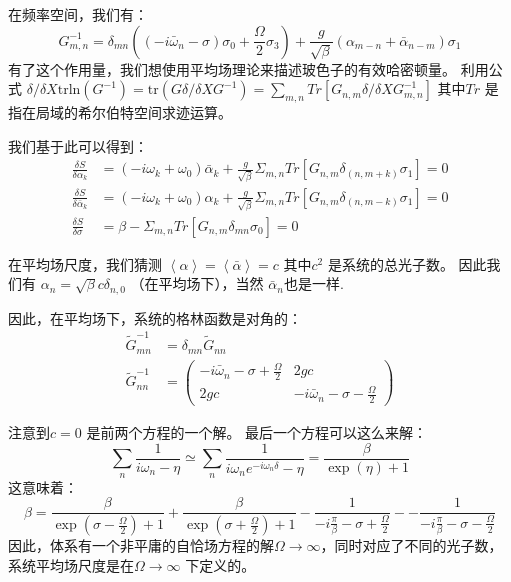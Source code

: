 \documentclass[supercite]{HustGraduPaper}
\begin{document}
在频率空间，我们有：
\begin{equation}
G^{-1}_{m,n} = \delta_{mn} \left( (-i \bar \omega_n-\sigma) \sigma_0 + \frac{\Omega}{2} \sigma_3 \right) + \frac{g}{\sqrt{\beta}} (\alpha_{m-n} + \bar \alpha_{n-m}) \sigma_1
\end{equation}
有了这个作用量，我们想使用平均场理论来描述玻色子的有效哈密顿量。
利用公式 $\delta/\delta X \text{trln} (G^{-1}) = \text{tr} (G\delta/\delta X G^{-1}) = \sum_{m,n} Tr[G_{n,m} \delta/\delta X G^{-1}_{m,n}]$ 其中$Tr$ 是指在局域的希尔伯特空间求迹运算。

我们基于此可以得到：
\begin{equation}
\begin{aligned}
\frac{\delta S}{\delta \alpha_k} &= (-i \omega_k + \omega_0) \bar \alpha_k + \frac{g}{\sqrt{\beta}} \Sigma_{m,n} Tr[G_{n,m} \delta_{(n,{m+k})} \sigma_1] =0\\
\frac{\delta S}{\delta \bar \alpha_k} &= (-i \omega_k + \omega_0) \alpha_k + \frac{g}{\sqrt{\beta}} \Sigma_{m,n} Tr[G_{n,m} \delta_{(n,{m-k})} \sigma_1]=0\\
\frac{\delta S}{\delta \sigma} &= \beta - \Sigma_{m,n} Tr[{G_{n,m} \delta_{mn} \sigma_0}]=0
\end{aligned}
\end{equation}

在平均场尺度，我们猜测 $\left\langle \alpha \right\rangle = \left\langle \bar\alpha \right\rangle = c$ 其中$c^2$ 是系统的总光子数。 因此我们有 $\alpha_n = \sqrt{\beta} c \delta_{n,0}$ （在平均场下），当然 $\bar \alpha_n$也是一样.

因此，在平均场下，系统的格林函数是对角的：
\begin{equation}
\begin{aligned}
\tilde G^{-1}_{mn} &= \delta_{mn} \tilde{G}_{nn}\\
\tilde{G}^{-1}_{nn} &= \left(\begin{array}{cc}
-i \bar \omega_n - \sigma + \frac{\Omega}{2} & 2g c \\ 
2g c & -i \bar \omega_n - \sigma - \frac{\Omega}{2}
\end{array} \right)
\end{aligned}
\end{equation}


注意到$c = 0$ 是前两个方程的一个解。
最后一个方程可以这么来解：
\begin{equation}
\sum_n \frac{1}{i \omega_n - \eta} \simeq \sum_n \frac{1}{i \omega_n e^{-i\omega_n\delta} - \eta} = \frac{\beta}{\exp(\eta)+1}
\end{equation}
这意味着：
\begin{equation}
\beta = \frac{\beta}{\exp(\sigma - \frac{\Omega}{2} ) + 1} +  \frac{\beta}{\exp(\sigma + \frac{\Omega}{2} ) + 1} - \frac{1}{-i \frac{\pi}{\beta} - \sigma + \frac{\Omega}{2}} - - \frac{1}{-i \frac{\pi}{\beta} - \sigma - \frac{\Omega}{2}}
\end{equation}
因此，体系有一个非平庸的自恰场方程的解$\Omega \to \infty$，同时对应了不同的光子数，系统平均场尺度是在$\Omega \to \infty$ 下定义的。 
\end{document}
